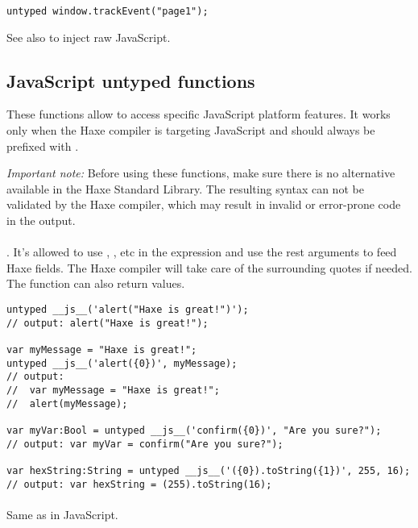 \begin{lstlisting}
untyped window.trackEvent("page1");  
\end{lstlisting}

See also  to inject raw JavaScript.

\subsection{JavaScript untyped functions}
\label{target-javascript-untyped}

These functions allow to access specific JavaScript platform features. It works only when the Haxe compiler is targeting JavaScript and should always be prefixed with . 

\emph{Important note:} Before using these functions, make sure there is no alternative available in the Haxe Standard Library. The resulting syntax can not be validated by the Haxe compiler, which may result in invalid or error-prone code in the output.

\paragraph{}
. It's allowed to use , ,  etc in the expression and use the rest arguments to feed Haxe fields. The Haxe compiler will take care of the surrounding quotes if needed. The function can also return values.

\begin{lstlisting}
untyped __js__('alert("Haxe is great!")');
// output: alert("Haxe is great!");

var myMessage = "Haxe is great!";
untyped __js__('alert({0})', myMessage);
// output: 
//	var myMessage = "Haxe is great!";
//	alert(myMessage);

var myVar:Bool = untyped __js__('confirm({0})', "Are you sure?");
// output: var myVar = confirm("Are you sure?");

var hexString:String = untyped __js__('({0}).toString({1})', 255, 16);
// output: var hexString = (255).toString(16);
\end{lstlisting}

\paragraph{} 
Same as  in JavaScript.

